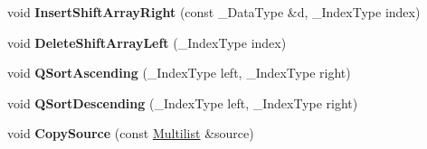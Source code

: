 \begin{DoxyCompactItemize}
\item 
\hypertarget{class_data_structures_1_1_multilist_aee663f800392364b9673b4d7d33547f2}{void {\bfseries Insert\-Shift\-Array\-Right} (const \-\_\-\-Data\-Type \&d, \-\_\-\-Index\-Type index)}\label{class_data_structures_1_1_multilist_aee663f800392364b9673b4d7d33547f2}

\item 
\hypertarget{class_data_structures_1_1_multilist_a920a4857ce7b9d4844bd9efd96d27762}{void {\bfseries Delete\-Shift\-Array\-Left} (\-\_\-\-Index\-Type index)}\label{class_data_structures_1_1_multilist_a920a4857ce7b9d4844bd9efd96d27762}

\item 
\hypertarget{class_data_structures_1_1_multilist_a566e3d1a805abb95a633f4d2dadd2a5c}{void {\bfseries Q\-Sort\-Ascending} (\-\_\-\-Index\-Type left, \-\_\-\-Index\-Type right)}\label{class_data_structures_1_1_multilist_a566e3d1a805abb95a633f4d2dadd2a5c}

\item 
\hypertarget{class_data_structures_1_1_multilist_a7589930edbda9c6c34c4fccdab2d5d55}{void {\bfseries Q\-Sort\-Descending} (\-\_\-\-Index\-Type left, \-\_\-\-Index\-Type right)}\label{class_data_structures_1_1_multilist_a7589930edbda9c6c34c4fccdab2d5d55}

\item 
\hypertarget{class_data_structures_1_1_multilist_a1dd3b8d06d3f7ddc2e1308c57ef602fe}{void {\bfseries Copy\-Source} (const \hyperlink{class_data_structures_1_1_multilist}{Multilist} \&source)}\label{class_data_structures_1_1_multilist_a1dd3b8d06d3f7ddc2e1308c57ef602fe}

\end{DoxyCompactItemize}
